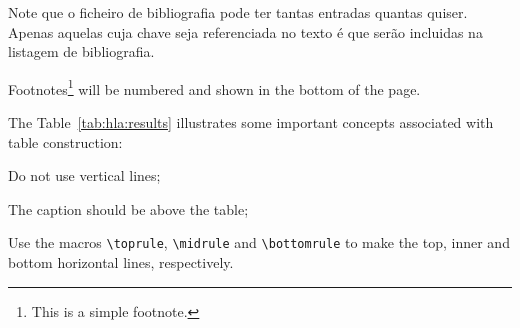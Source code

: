 Note que o ficheiro de bibliografia pode ter tantas entradas quantas quiser. Apenas aquelas cuja chave seja referenciada no texto é que serão incluidas na listagem de bibliografia.




Footnotes\footnote{This is a simple footnote.} will be numbered and shown in the bottom of the page.




The Table~\ref{tab:hla:results} illustrates some important concepts associated with table construction:
\begin{asparaenum}[i)]
\item Do not use vertical lines;
\item The caption should be above the table;
\item Use the macros \verb!\toprule!, \verb!\midrule! and \verb!\bottomrule! to make the top, inner and bottom horizontal lines, respectively.
\end{asparaenum}

